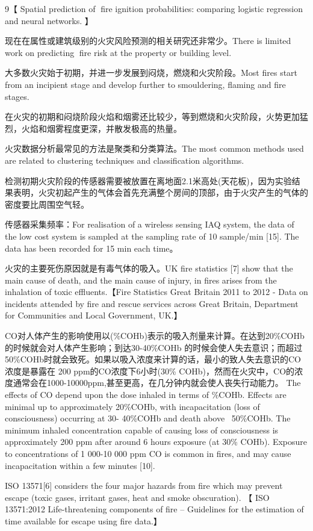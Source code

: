 \documentclass[UTF8]{ctexart}
\begin{document}
	9【	Spatial prediction of fire ignition
	probabilities: comparing logistic regression and neural
	networks. 】
	
	
	现在在属性或建筑级别的火灾风险预测的相关研究还非常少。There is limited work on predicting fire risk at the property or building level.
	
	大多数火灾始于初期，并进一步发展到闷烧，燃烧和火灾阶段。Most fires start from an incipient stage and develop further to smouldering, flaming and fire stages.\cite{andrew_multi-stage_2016}
	
	在火灾的初期和闷烧阶段火焰和烟雾还比较少，等到燃烧和火灾阶段，火势更加猛烈，火焰和烟雾程度更深，并散发极高的热量。\cite{andrew_multi-stage_2016}
	
	火灾数据分析最常见的方法是聚类和分类算法。The most common methods used are related to clustering techniques and classification algorithms.
	
	检测初期火灾阶段的传感器需要被放置在离地面2.1米高处(天花板)，因为实验结果表明\cite{andrew_multi-stage_2016}，火灾初起产生的气体会首先充满整个房间的顶部，由于火灾产生的气体的密度要比周围空气轻。
	
	传感器采集频率：For realisation of a wireless sensing IAQ system, the data of the low cost system is sampled at the sampling rate of 10 sample/min [15]. The data has been recorded for 15 min each time。
	
	火灾的主要死伤原因就是有毒气体的吸入。\cite{molyneux2014correlation}UK fire statistics [7] show that the main cause of death, and the main cause of injury, in fires arises from the inhalation of toxic effluents.【Fire Statistics Great Britain 2011 to 2012 - Data on incidents attended by fire and rescue services across Great Britain, Department for Communities and Local Government, UK.】
	
	CO对人体产生的影响使用以(\%COHb)表示的吸入剂量来计算。在达到20\%COHb的时候就会对人体产生影响；到达30-40\%COHb 的时候会使人失去意识；而超过50\%COHb时就会致死。如果以吸入浓度来计算的话，最小的致人失去意识的CO浓度是暴露在 200 ppm的CO浓度下6小时(30\% COHb)，然而在火灾中，CO的浓度通常会在1000-10000ppm,甚至更高，在几分钟内就会使人丧失行动能力。\cite{molyneux2014correlation}  The effects of CO depend upon the dose inhaled in terms of \%COHb. Effects are
	minimal up to approximately 20\%COHb, with incapacitation (loss of consciousness) occurring at 30-
	40\%COHb and death above ~50\%COHb. The minimum inhaled concentration capable of causing loss of
	consciousness is approximately 200 ppm after around 6 hours exposure (at 30\% COHb). Exposure to
	concentrations of 1 000-10 000 ppm CO is common in fires, and may cause incapacitation within a few
	minutes [10].
	
	ISO 13571[6] considers the four major hazards from fire
	which may prevent escape (toxic gases, irritant gases, heat and smoke obscuration). 【 ISO 13571:2012 Life-threatening components of fire – Guidelines for the estimation of time
	available for escape using fire data.】
	
\end{document}
